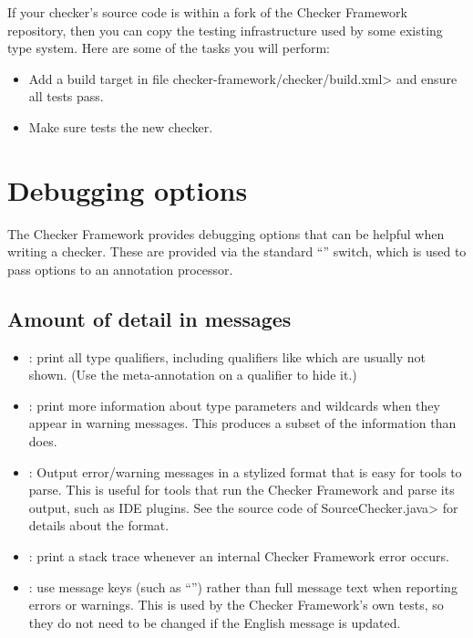 If your checker's source code is within a fork of the Checker Framework
repository, then you can copy the testing infrastructure used by some
existing type system.  Here are some of the tasks you will perform:

\begin{itemize}
\item Add a  build target in file
  \<checker-framework/checker/build.xml> and ensure all tests pass.

\item Make sure  tests the new checker.
\end{itemize}


\section{Debugging options\label{creating-debugging-options}}

The Checker Framework provides debugging options that can be helpful when
writing a checker. These are provided via the standard  ``''
switch, which is used to pass options to an annotation processor.


\subsection{Amount of detail in messages\label{creating-debugging-options-detail}}

\begin{itemize}
\item {}: print all type qualifiers, including
qualifiers like  which are usually not shown.
(Use the  meta-annotation on a qualifier to hide it.)

\item {}: print more information about type
  parameters and wildcards when they appear in warning messages.  This
  produces a subset of the information than  does.

\item {}: Output error/warning messages in a
  stylized format that is easy for tools to parse.  This is useful for
  tools that run the Checker Framework and parse its output, such as IDE
  plugins.  See the source code of \<SourceChecker.java> for details about
  the format.

\item {}: print a stack trace whenever an
internal Checker Framework error occurs.

\item {}: use message keys (such as ``'')
rather than full message text when reporting errors or warnings.  This is
used by the Checker Framework's own tests, so they do not need to be
changed if the English message is updated.

\end{itemize}

